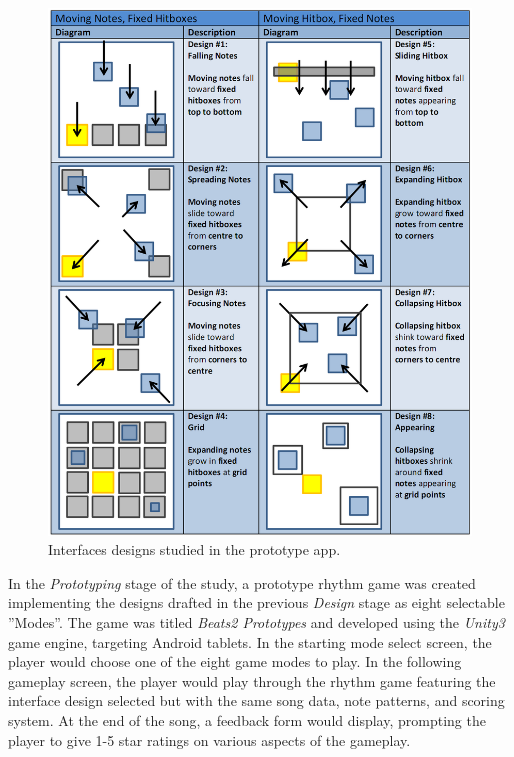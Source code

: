 \documentclass[annual]{acmsiggraph}
\begin{document}
\begin{figure}[htb!]
	\begin{center}
		\includegraphics[width=0.95\linewidth]{figure_demo_interfaces}
	\end{center}
	\vspace{-6pt}
	\caption{Interfaces designs studied in the prototype app.}
	\label{fig:demo_interfaces}
\end{figure}

In the \textit{Prototyping} stage of the study, a prototype rhythm game was created implementing the designs drafted in the previous \textit{Design} stage as eight selectable ''Modes''. The game was titled \textit{Beats2 Prototypes} and developed using the \textit{Unity3} game engine, targeting Android tablets. In the starting mode select screen, the player would choose one of the eight game modes to play. In the following gameplay screen, the player would play through the rhythm game featuring the interface design selected but with the same song data, note patterns, and scoring system. At the end of the song, a feedback form would display, prompting the player to give 1-5 star ratings on various aspects of the gameplay.
\end{document}
